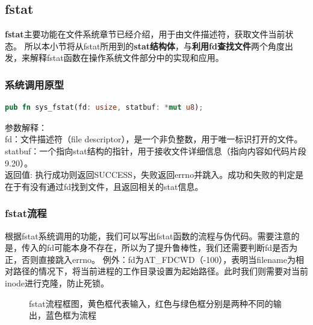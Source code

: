 
\subsection{fstat}


\textbf{fstat}主要功能在文件系统章节已经介绍，用于由文件描述符，获取文件当前状态。
所以本小节将从fstat所用到的\textbf{stat结构体}，与\textbf{利用fd查找文件}两个角度出发，来解释fstat函数在操作系统文件部分中的实现和应用。\\

\subsubsection{系统调用原型}
\begin{lstlisting}[language={Rust}, 
	caption={os/src/syscall/fs.rs}]
    pub fn sys_fstat(fd: usize, statbuf: *mut u8);
\end{lstlisting}
参数解释：\\
fd：文件描述符（file descriptor），是一个非负整数，用于唯一标识打开的文件。\\
statbuf：一个指向stat结构的指针，用于接收文件详细信息（指向内容如代码片段9.20）。\\
返回值: 执行成功则返回SUCCESS，失败返回errno并跳入。成功和失败的判定是在于有没有通过fd找到文件，且返回相关的stat信息。\\

\subsubsection{fstat流程}
根据fstat系统调用的功能，我们可以写出fstat函数的流程与伪代码。需要注意的是，传入的fd可能本身不存在，所以为了提升鲁棒性，我们还需要判断fd是否为正，否则直接跳入errno。
例外：fd为AT_FDCWD（-100），表明当filename为相对路径的情况下，将当前进程的工作目录设置为起始路径。此时我们则需要对当前inode进行克隆，防止死锁。
\begin{figure}[H]
    \centering
    \caption{fstat流程框图，黄色框代表输入，红色与绿色框分别是两种不同的输出，蓝色框为流程}
\end{figure}

